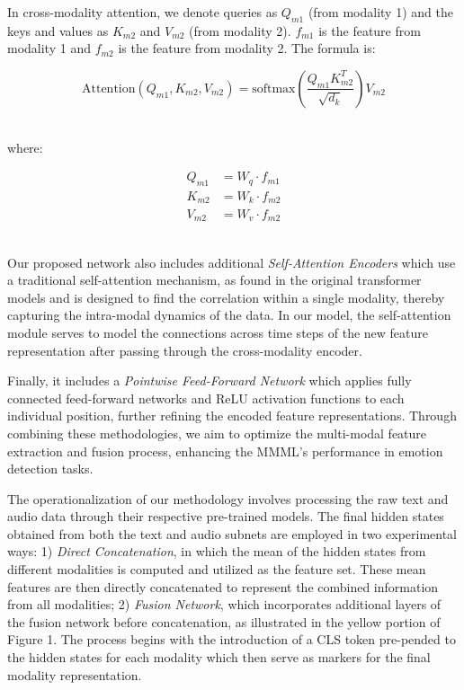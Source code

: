 \documentclass[11pt]{article}
\begin{document}
In cross-modality attention, we denote queries as $Q_{m1}$ (from modality 1) and the keys and values as $K_{m2}$ and $V_{m2}$ (from modality 2). $f_{m1}$ is the feature from modality 1 and $f_{m2}$ is the feature from modality 2. The formula is:
\begin{shrinkeq}{-1ex}{-3ex}
{\small
    \begin{equation*}
    \text{Attention}(Q_{m1}, K_{m2}, V_{m2}) = \text{softmax}\left(\frac{Q_{m1} K_{m2}^T}{\sqrt{d_k}}\right)V_{m2}
    \end{equation*}
}
\end{shrinkeq}\\
where:   
\begin{shrinkeq}{-1ex}{-3ex}
{\small
    \begin{align*}
    Q_{m1} &= W_q \cdot f_{m1}\\
    K_{m2} &= W_k \cdot f_{m2}\\
    V_{m2} &= W_v \cdot f_{m2}
    \end{align*}
}
\end{shrinkeq}\\
Our proposed network also includes additional {\it Self-Attention Encoders} which use a traditional self-attention mechanism, as found in the original transformer models and is designed to find the correlation within a single modality, thereby capturing the intra-modal dynamics of the data. In our model, the self-attention module serves to model the connections across time steps of the new feature representation after passing through the cross-modality encoder.

Finally, it includes a {\it Pointwise Feed-Forward Network} which applies fully connected feed-forward networks and ReLU activation functions to each individual position, further refining the encoded feature representations. Through combining these methodologies, we aim to optimize the multi-modal feature extraction and fusion process, enhancing the MMML's performance in emotion detection tasks.

The operationalization of our methodology involves processing the raw text and audio data through their respective pre-trained models. The final hidden states obtained from both the text and audio subnets are employed in two experimental ways:  1) {\it Direct Concatenation}, in which the mean of the hidden states from different modalities is computed and utilized as the feature set. These mean features are then directly concatenated to represent the combined information from all modalities; 2) {\it Fusion Network}, which incorporates additional layers of the fusion network before concatenation, as illustrated in the yellow portion of Figure 1. The process begins with the introduction of a CLS token pre-pended to the hidden states for each modality which then serve as markers for the final modality representation.
\end{document}
